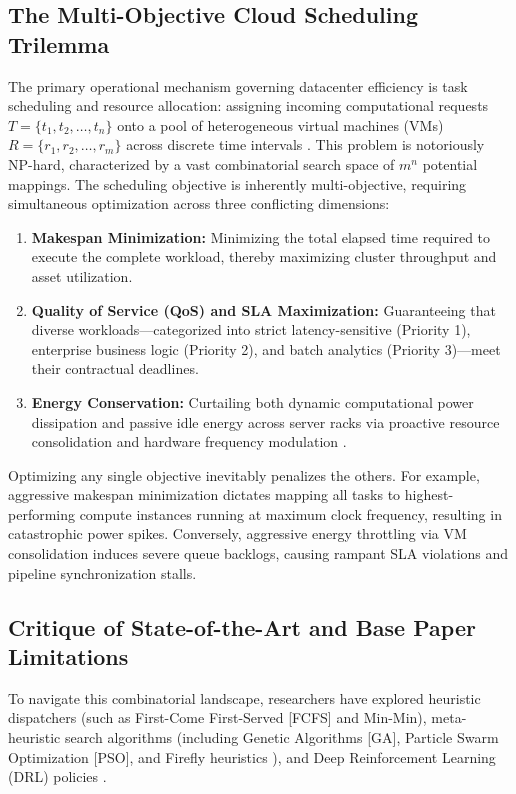 \documentclass[default,sn-mathphys-num]{sn-jnl}
\theoremstyle{thmstyleone}
\theoremstyle{thmstyletwo}
\theoremstyle{thmstylethree}
\begin{document}
\subsection{The Multi-Objective Cloud Scheduling Trilemma}
The primary operational mechanism governing datacenter efficiency is task scheduling and resource allocation: assigning incoming computational requests $T = \{t_1, t_2, \dots, t_n\}$ onto a pool of heterogeneous virtual machines (VMs) $R = \{r_1, r_2, \dots, r_m\}$ across discrete time intervals \cite{kumar2020energy}. This problem is notoriously NP-hard, characterized by a vast combinatorial search space of $m^n$ potential mappings. The scheduling objective is inherently multi-objective, requiring simultaneous optimization across three conflicting dimensions:
\begin{enumerate}
    \item \textbf{Makespan Minimization:} Minimizing the total elapsed time required to execute the complete workload, thereby maximizing cluster throughput and asset utilization.
    \item \textbf{Quality of Service (QoS) and SLA Maximization:} Guaranteeing that diverse workloads---categorized into strict latency-sensitive (Priority 1), enterprise business logic (Priority 2), and batch analytics (Priority 3)---meet their contractual deadlines.
    \item \textbf{Energy Conservation:} Curtailing both dynamic computational power dissipation and passive idle energy across server racks via proactive resource consolidation and hardware frequency modulation \cite{devaraju2022dvfs, lesueur2010slow}.
\end{enumerate}

Optimizing any single objective inevitably penalizes the others. For example, aggressive makespan minimization dictates mapping all tasks to highest-performing compute instances running at maximum clock frequency, resulting in catastrophic power spikes. Conversely, aggressive energy throttling via VM consolidation induces severe queue backlogs, causing rampant SLA violations and pipeline synchronization stalls.

\subsection{Critique of State-of-the-Art and Base Paper Limitations}
To navigate this combinatorial landscape, researchers have explored heuristic dispatchers (such as First-Come First-Served [FCFS] and Min-Min), meta-heuristic search algorithms (including Genetic Algorithms [GA], Particle Swarm Optimization [PSO], and Firefly heuristics \cite{deb2002fast, devaraj2020multiobjective, almasri2023multiobjective}), and Deep Reinforcement Learning (DRL) policies \cite{mnih2015human, arousi2023reinforcement, chen2021deep}. 
\end{document}
